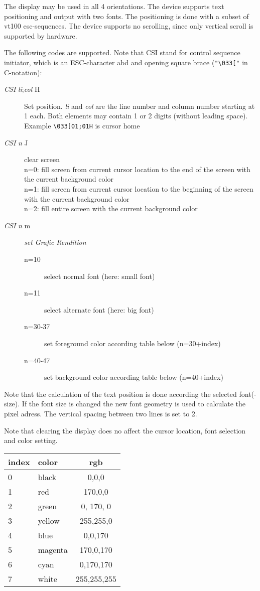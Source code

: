 The display may be used in all 4 orientations. The device supports
text positioning and output with two fonts. The positioning is done with
a subset of vt100 esc-sequences.
The device supports no scrolling, since only vertical scroll is supported 
by hardware.

The following codes are supported. Note that CSI stand for
control sequence initiator, which is an ESC-character abd and opening square 
brace (\verb|"\033["| in C-notation):
\begin{description}
\item[{\em CSI}  {\em li};{\em col} H] 
    Set position. {\em li} and {\em col} are the line
    number and column number starting at 1 each. Both elements may contain
    1 or 2 digits (without leading space). Example \verb|\033[01;01H|
 is cursor home
\item[{\em CSI}  {\em n} J]  clear screen\\
n=0: fill screen from current cursor location to the end of the 
    screen with the current background color
\\
n=1: fill screen from current cursor location to the beginning of the 
    screen with the current background color
\\
n=2: fill entire screen with the current background color
\item[{\em CSI}  {\em n} m] {\em set Grafic Rendition}
    \begin{description}
    \item[n=10] select normal font (here: small font)
    \item[n=11] select alternate font (here: big font)
    \item[n=30-37] set foreground color according table below (n=30+index)
    \item[n=40-47] set background color according table below (n=40+index)
    \end{description}
\end{description}

Note that the calculation of the text position is done according the 
selected font(-size). If the font size is changed the new font geometry 
is used to calculate the pixel adress. The vertical spacing between two lines
is set to 2.

Note that clearing the display does no affect the cursor location, 
font selection and color setting.

\begin{tabular}{|l|l|c|}
\hline
index & color  & rgb \\
\hline
0 & black  & 0,0,0\\
1 & red  & 170,0,0\\
2 & green & 0, 170, 0 \\
3 & yellow & 255,255,0 \\
4 & blue & 0,0,170\\
5 & magenta & 170,0,170\\
6 & cyan & 0,170,170\\
7 &white & 255,255,255\\
\hline
\end{tabular}

